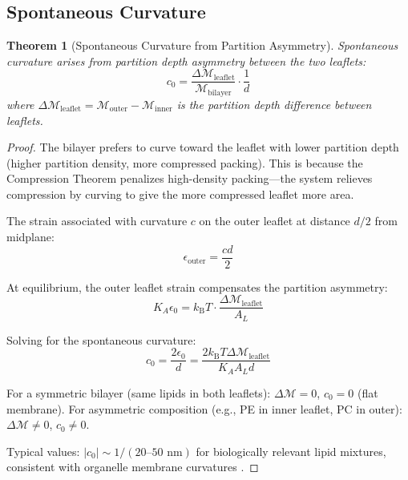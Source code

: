 \documentclass[twocolumn,10pt]{article}
\newtheorem{theorem}{Theorem}[section]
\theoremstyle{remark}
\newcommand{\kB}{k_{\mathrm{B}}}
\newcommand{\Depth}{\mathcal{M}}
\begin{document}
\subsection{Spontaneous Curvature}

\begin{theorem}[Spontaneous Curvature from Partition Asymmetry]
\label{thm:curvature}
Spontaneous curvature arises from partition depth asymmetry between the two leaflets:
\begin{equation}
    c_0 = \frac{\Delta\Depth_{\text{leaflet}}}{\Depth_{\text{bilayer}}} \cdot \frac{1}{d}
\end{equation}
where $\Delta\Depth_{\text{leaflet}} = \Depth_{\text{outer}} - \Depth_{\text{inner}}$ is the partition depth difference between leaflets.
\end{theorem}

\begin{proof}
The bilayer prefers to curve toward the leaflet with lower partition depth (higher partition density, more compressed packing). This is because the Compression Theorem penalizes high-density packing---the system relieves compression by curving to give the more compressed leaflet more area.

The strain associated with curvature $c$ on the outer leaflet at distance $d/2$ from midplane:
\begin{equation}
    \epsilon_{\text{outer}} = \frac{cd}{2}
\end{equation}

At equilibrium, the outer leaflet strain compensates the partition asymmetry:
\begin{equation}
    K_A \epsilon_0 = \kB T \cdot \frac{\Delta\Depth_{\text{leaflet}}}{A_L}
\end{equation}

Solving for the spontaneous curvature:
\begin{equation}
    c_0 = \frac{2\epsilon_0}{d} = \frac{2\kB T \Delta\Depth_{\text{leaflet}}}{K_A A_L d}
\end{equation}

For a symmetric bilayer (same lipids in both leaflets): $\Delta\Depth = 0$, $c_0 = 0$ (flat membrane). For asymmetric composition (e.g., PE in inner leaflet, PC in outer): $\Delta\Depth \neq 0$, $c_0 \neq 0$.

Typical values: $|c_0| \sim 1/(20\text{--}50 \text{ nm})$ for biologically relevant lipid mixtures, consistent with organelle membrane curvatures \cite{mcmahon2005,zimmerberg2006}.
\end{proof}
\end{document}
